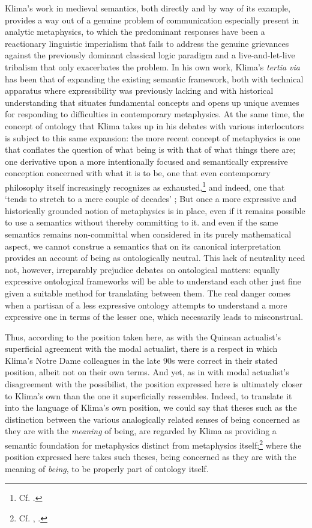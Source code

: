 \documentclass[]{article}
\begin{document}
Klima's work in medieval semantics, 
both directly and by way of its example, 
provides a way out of a genuine problem of communication especially present in analytic metaphysics,
to which the predominant responses have been 
a reactionary linguistic imperialism that fails to address the genuine grievances against the previously dominant classical logic paradigm 
and a live-and-let-live tribalism that only exacerbates the problem. 
In his own work, Klima's \emph{tertia via} has been that of expanding the existing semantic framework, 
both with technical apparatus where expressibility was previously lacking 
and with historical understanding that situates fundamental concepts 
and opens up unique avenues for responding to difficulties in contemporary metaphysics. 
At the same time, 
the concept of ontology that Klima takes up in his debates with various interlocutors is subject to this same expansion: 
the more recent concept of metaphysics is 
one that conflates the question of what being is with that of what things there are;
one derivative upon a more intentionally focused and semantically expressive conception concerned with what it is to be, 
one that even contemporary philosophy itself increasingly recognizes as exhausted,\footnote{Cf. \autocite{Schaffer2009}.}
and indeed, one that `tends to stretch to a mere couple of decades' \autocite[17]{Klima2005}; 
But once a more expressive and historically grounded notion of metaphysics is in place, 
even if it remains possible to use a semantics 
without thereby committing to it. 
and even if the same semantics remains non-committal when considered in its purely mathematical aspect, 
we cannot construe a semantics that on its canonical interpretation provides an account of being as ontologically neutral. 
This lack of neutrality need not, however, irreparably prejudice debates on ontological matters:
equally expressive ontological frameworks will be able to understand each other just fine given a suitable method for translating between them.
The real danger comes when a partisan of a less expressive ontology attempts to understand a more expressive one in terms of the lesser one, 
which necessarily leads to misconstrual. 

Thus, 
according to the position taken here, 
as with the Quinean actualist's superficial agreement with the modal actualist, 
there is a respect in which Klima's Notre Dame colleagues in the late 90s were correct in their stated position, 
albeit not on their own terms. 
And yet, as in with modal actualist's disagreement with the possibilist, 
the position expressed here is ultimately closer to Klima's own than the one it superficially ressembles.
Indeed, to translate it into the language of Klima's own position, 
we could say that theses such as the distinction between the various analogically related senses of being 
concerned as they are with the \emph{meaning} of being, 
are regarded by Klima as providing a semantic foundation for metaphysics distinct from metaphysics itself;\footnote{Cf. \autocite[88]{Klima1996}, \autocite[49]{Klima2011b}.}
where the position expressed here takes such theses, 
being concerned as they are with the meaning of \emph{being},
to be properly part of ontology itself. 
\end{document}
